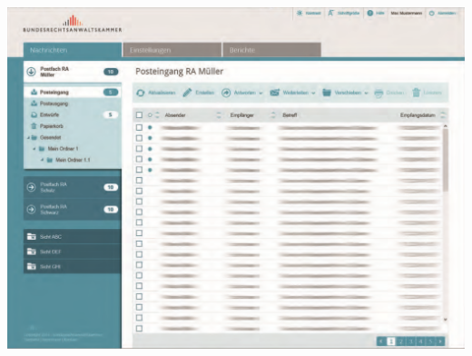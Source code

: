 \begin{center}
	\includegraphics[width=\textwidth]{beA-ui1.png}
	\label{bea:gui:overview}
\end{center}

